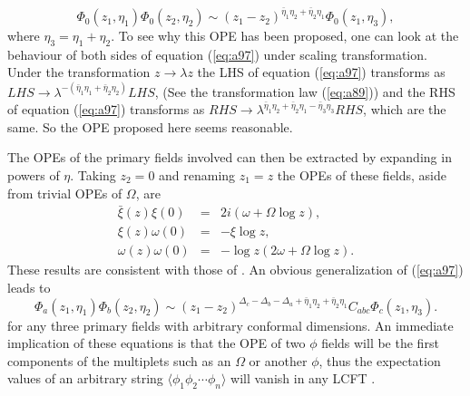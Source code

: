\documentclass[a4paper,11pt]{article}
\begin{document}
\begin{equation}\label{eq:a97}
{\Phi}_{0} (z_1,\eta_1) \Phi_0(z_2,\eta_2) \sim
(z_1-z_2)^{\bar{\eta}_1 \eta_2 +\bar{\eta}_2 \eta_1}
\Phi_0(z_1,\eta_3),
\end{equation}
where $\eta_3= \eta_1 + \eta_2$. To see why this OPE has been
proposed, one can look at the behaviour of both sides of equation
(\ref{eq:a97}) under scaling transformation. Under the
transformation $z \rightarrow \lambda z$ the LHS of equation
(\ref{eq:a97}) transforms as $LHS \rightarrow
\lambda^{-(\bar{\eta}_1 \eta_1 + \bar{\eta}_2 \eta_2)} LHS$, (See
the transformation law (\ref{eq:a89})) and the RHS of equation
(\ref{eq:a97}) transforms as $RHS \rightarrow
\lambda^{\bar{\eta}_1 \eta_2 +\bar{\eta}_2 \eta_1- \bar{\eta}_3
\eta_3} RHS$, which are the same. So the OPE proposed here seems
reasonable.

The OPEs of the primary fields involved can then be extracted by
expanding in powers of $\eta$. Taking $z_2=0$ and renaming
$z_1=z$ the OPEs of these fields, aside from trivial OPEs of
$\Omega$, are
\begin{eqnarray}\label{eq:a98}
\bar{\xi}(z)\xi(0)&=&2i(\omega+\Omega\log{z}),\nonumber\\
\xi(z)\omega(0)&=&-\xi \log{z},\nonumber\\
\omega(z)\omega(0)&=&-\log{z} (2\omega+\Omega \log{z}).
\end{eqnarray}
These results are consistent with those of \cite{kausch}. An
obvious generalization of (\ref{eq:a97}) leads to
\begin{equation}\label{eq:a101}
\Phi_{a}(z_1,\eta_1) \Phi_{b}(z_2,\eta_2) \sim
(z_1-z_2)^{\Delta_{c}- \Delta_{b} - \Delta_{a} + \bar{\eta}_1
\eta_2 + \bar{\eta}_2 \eta_1} C_{abc} \Phi_{c}(z_1,\eta_3).
\end{equation}
for any three primary fields with arbitrary conformal dimensions.
An immediate implication of these equations is that the OPE of two
$\phi$ fields will be the first components of the multiplets such
as an $\Omega$ or another $\phi$, thus the expectation values of
an arbitrary string $\langle
\phi_{1}\phi_{2}\cdots\phi_{n}\rangle$ will vanish in any LCFT
\cite{floh2}.
\end{document}
